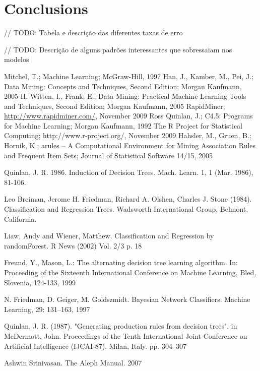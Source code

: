 \documentclass[a4paper]{llncs}
\begin{document}
\section{Conclusions}

// TODO: Tabela e descrição das diferentes taxas de erro

// TODO: Descrição de alguns padrões interessantes que sobressaiam nos modelos

\begin{thebibliography}{1}
Mitchel, T.; Machine Learning; McGraw-Hill, 1997
Han, J., Kamber, M., Pei, J.; Data Mining: Concepts and Techniques, Second Edition; Morgan Kaufmann, 2005
H. Witten, I., Frank, E.; Data Mining: Practical Machine Learning Tools and Techniques, Second Edition; Morgan Kaufmann, 2005
RapidMiner; \url{http://www.rapidminer.com/}, November 2009
Ross Quinlan, J.; C4.5: Programs for Machine Learning; Morgan Kaufmann, 1992
The R Project for Statistical Computing; http://www.r-project.org/, November 2009
Hahsler, M., Gruen, B.; Hornik, K.; arules -- A Computational Environment for Mining Association Rules and Frequent Item Sets; Journal of Statistical Software 14/15, 2005

Quinlan, J. R. 1986. Induction of Decision Trees. Mach. Learn. 1, 1 (Mar. 1986), 81-106.

Leo Breiman, Jerome H. Friedman, Richard A. Olshen, Charles J. Stone (1984). Classification and Regression Trees. Wadsworth International Group, Belmont, California.

Liaw, Andy and Wiener, Matthew. Classification and Regression by randomForest. R News (2002) Vol. 2/3 p. 18

Freund, Y., Mason, L.: The alternating decision tree learning algorithm. In: Proceeding of the Sixteenth International Conference on Machine Learning, Bled, Slovenia, 124-133, 1999

N. Friedman, D. Geiger, M. Goldszmidt. Bayesian Network Classifiers. Machine Learning, 29: 131–163, 1997

Quinlan, J. R. (1987). "Generating production rules from decision trees". in McDermott, John. Proceedings of the Tenth International Joint Conference on Artificial Intelligence (IJCAI-87). Milan, Italy. pp. 304–307

Ashwin Srinivasan. The Aleph Manual. 2007


\end{thebibliography}
\end{document}
